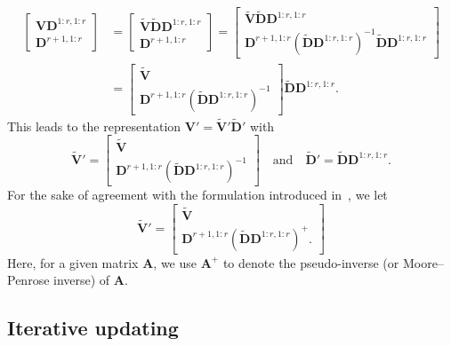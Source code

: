 \documentclass[11pt,a4paper]{article}
\theoremstyle{break}
\numberwithin{dummy}{section}
\theoremstyle{plain}
\theoremstyle{plain}
\theoremstyle{plain}
\theoremstyle{plain}
\theoremstyle{plain}
\theoremstyle{MyNonumberplain}
\newcommand{\0}{\M{0}}
\newcommand{\M}[1]{\mathbf{#1}}
\newcommand{\Mt}[1]{\tilde{\M{#1}}}
\begin{document}
\begin{enumerate}[font=\upshape,label=(\roman*),wide,align=right]
\begin{align*}
\begin{bmatrix}
          \M{V} \M{D}^{1:r,1:r}
          \\
          \M{D}^{r+1,1:r}
        \end{bmatrix}
      & =
        \begin{bmatrix}
          \Mt{V} \Mt{D} \M{D}^{1:r,1:r}
          \\
          \M{D}^{r+1,1:r}
        \end{bmatrix}
    =
    \begin{bmatrix}
      \Mt{V} \Mt{D} \M{D}^{1:r, 1:r}
      \\
      \M{D}^{r+1, 1:r} \left(\Mt{D} \M{D}^{1:r,1:r} \right)^{-1} \Mt{D} \M{D}^{1:r, 1:r}
    \end{bmatrix}
    \\
      & =
        \begin{bmatrix}
          \Mt{V}
          \\
          \M{D}^{r+1, 1:r} \left(\Mt{D} \M{D}^{1:r,1:r} \right)^{-1}
        \end{bmatrix}
    \Mt{D} \M{D}^{1:r, 1:r}.
  \end{align*}
  This leads to the representation
  \begin{math}
    \M{V}' = \Mt{V}' \Mt{D}'
  \end{math}
  with
  \begin{displaymath}
    \Mt{V}' =
    \begin{bmatrix}
      \Mt{V}
      \\
      \M{D}^{r+1, 1:r} \left(\Mt{D} \M{D}^{1:r,1:r} \right)^{-1}
    \end{bmatrix}
    \quad
    \text{and}
    \quad
    \Mt{D}' =
    \Mt{D} \M{D}^{1:r, 1:r}.
  \end{displaymath}
  For the sake of agreement with the formulation introduced in~\cite{brand06:_fast}, we let
   \begin{displaymath}
    \Mt{V}' =
    \begin{bmatrix}
      \Mt{V}
      \\
      \M{D}^{r+1, 1:r} \left(\Mt{D} \M{D}^{1:r,1:r} \right)^+.
    \end{bmatrix}
  \end{displaymath}
  Here, for a given matrix $\M{A}$, we use $\M{A}^+$ to denote the pseudo-inverse (or Moore--Penrose inverse) of $\M{A}$.
\end{enumerate}

\subsection{Iterative updating}
\end{document}

